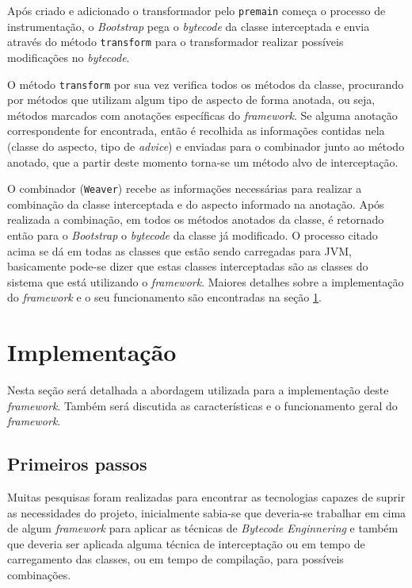 \documentclass[tc,oneside]{iiufrgs}
\begin{document}
Após criado e adicionado o transformador pelo \texttt{premain} começa o processo de instrumentação, o \textit{Bootstrap} pega o \textit{bytecode} da classe interceptada e envia através do método \texttt{transform} para o transformador realizar possíveis modificações no \textit{bytecode}.

O método \texttt{transform} por sua vez verifica todos os métodos da classe, procurando por métodos que utilizam algum tipo de aspecto de forma anotada, ou seja, métodos marcados com anotações específicas do \textit{framework}. Se alguma anotação correspondente for encontrada, então é recolhida as informações contidas nela (classe do aspecto, tipo de \textit{advice}) e enviadas para o combinador junto ao método anotado, que a partir deste momento torna-se um método alvo de interceptação.

O combinador (\texttt{Weaver}) recebe as informações necessárias para realizar a combinação da classe interceptada e do aspecto informado na anotação. Após realizada a combinação, em todos os métodos anotados da classe, é retornado então para o \textit{Bootstrap} o \textit{bytecode} da classe já modificado. O processo citado acima se dá em todas as classes que estão sendo carregadas para JVM, basicamente pode-se dizer que estas classes interceptadas são as classes do sistema que está utilizando o \textit{framework}. Maiores detalhes sobre a implementação do \textit{framework} e o seu funcionamento são encontradas na seção \ref{sec:imp}.

\section{Implementação}
\label{sec:imp}

Nesta seção será detalhada a abordagem utilizada para a implementação deste \textit{framework}. Também será discutida as características e o funcionamento geral do \textit{framework}.

\subsection{Primeiros passos}

Muitas pesquisas foram realizadas para encontrar as tecnologias capazes de suprir as necessidades do projeto, inicialmente sabia-se que deveria-se trabalhar em cima de algum \textit{framework} para aplicar as técnicas de \textit{Bytecode Enginnering} e também que deveria ser aplicada alguma técnica de interceptação ou em tempo de carregamento das classes, ou em tempo de compilação, para possíveis combinações.
\end{document}
